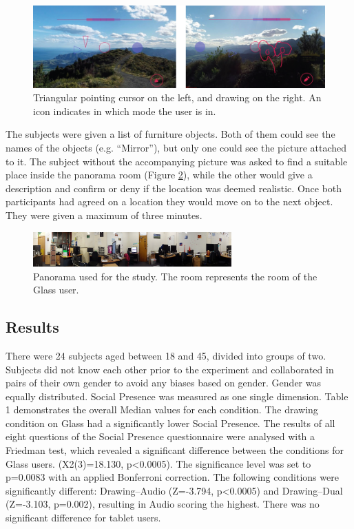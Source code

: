 \begin{figure}[ht]
	\centering
	\includegraphics[width=\linewidth]{images/ismar14/pointing-drawing}
	\caption{Triangular pointing cursor on the left, and drawing on the right. An icon indicates in which mode the user is in.}
	\label{fig:ismar14:pointing-drawing}
\end{figure}

The subjects were given a list of furniture objects. Both of them could see the names of the objects (e.g. “Mirror”), but only one could see the picture attached to it. The subject without the accompanying picture was asked to find a suitable place inside the panorama room (Figure \ref{fig:ismar14:envrionment-setup}), while the other would give a description and confirm or deny if the location was deemed realistic. Once both participants had agreed on a location they would move on to the next object. They were given a maximum of three minutes.

\begin{figure}[ht]
	\centering
	\includegraphics[width=3in]{images/ismar14/envrionment-setup}
	\caption{Panorama used for the study. The room represents the room of the Glass user.}
	\label{fig:ismar14:envrionment-setup}
\end{figure}

\subsection{Results}

There were 24 subjects aged between 18 and 45, divided into groups of two. Subjects did not know each other prior to the experiment and collaborated in pairs of their own gender to avoid any biases based on gender. Gender was equally distributed. Social Presence was measured as one single dimension. Table 1 demonstrates the overall Median values for each condition. The drawing condition on Glass had a significantly lower Social Presence. The results of all eight questions of the Social Presence questionnaire were analysed with a Friedman test, which revealed a significant difference between the conditions for Glass users. (X2(3)=18.130, p<0.0005). The significance level was set to p=0.0083 with an applied Bonferroni correction. The following conditions were significantly different: Drawing–Audio (Z=-3.794, p<0.0005) and Drawing–Dual (Z=-3.103, p=0.002), resulting in Audio scoring the highest. There was no significant difference for tablet users.

